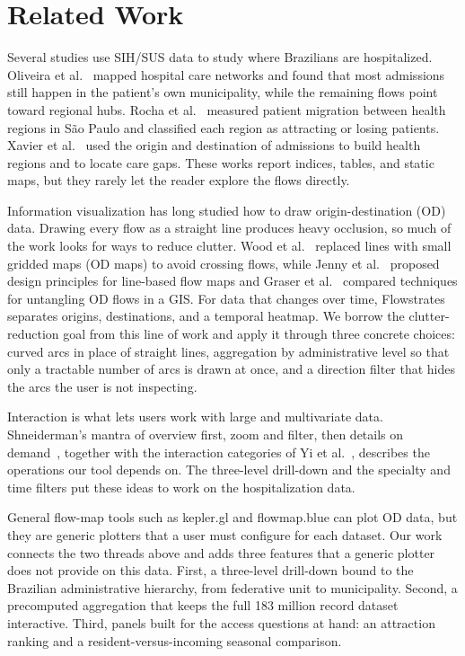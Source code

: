 \section{Related Work}

Several studies use SIH/SUS data to study where Brazilians are hospitalized.
Oliveira et al.~\cite{Oliveira2004TerritoriosSistema} mapped hospital care networks and found that most admissions still happen in the patient's own municipality, while the remaining flows point toward regional hubs.
Rocha et al.~\cite{Rocha2015HospitalizationFlow} measured patient migration between health regions in S\~{a}o Paulo and classified each region as attracting or losing patients.
Xavier et al.~\cite{Xavier2019RegioesSaude} used the origin and destination of admissions to build health regions and to locate care gaps.
These works report indices, tables, and static maps, but they rarely let the reader explore the flows directly.

Information visualization has long studied how to draw origin-destination (OD) data.
Drawing every flow as a straight line produces heavy occlusion, so much of the work looks for ways to reduce clutter.
Wood et al.~\cite{Wood2010VisualisationOrigins} replaced lines with small gridded maps (OD maps) to avoid crossing flows, while Jenny et al.~\cite{Jenny2018DesignPrinciples} proposed design principles for line-based flow maps and Graser et al.~\cite{Graser2019Untangling} compared techniques for untangling OD flows in a GIS.
For data that changes over time, Flowstrates~\cite{Boyandin2011Flowstrates} separates origins, destinations, and a temporal heatmap.
We borrow the clutter-reduction goal from this line of work and apply it through three concrete choices: curved arcs in place of straight lines, aggregation by administrative level so that only a tractable number of arcs is drawn at once, and a direction filter that hides the arcs the user is not inspecting.

Interaction is what lets users work with large and multivariate data.
Shneiderman's mantra of overview first, zoom and filter, then details on demand~\cite{Shneiderman1996EyesHaveIt}, together with the interaction categories of Yi et al.~\cite{Yi2007TowardDeeper}, describes the operations our tool depends on.
The three-level drill-down and the specialty and time filters put these ideas to work on the hospitalization data.

General flow-map tools such as kepler.gl and flowmap.blue can plot OD data, but they are generic plotters that a user must configure for each dataset.
Our work connects the two threads above and adds three features that a generic plotter does not provide on this data.
First, a three-level drill-down bound to the Brazilian administrative hierarchy, from federative unit to municipality.
Second, a precomputed aggregation that keeps the full 183 million record dataset interactive.
Third, panels built for the access questions at hand: an attraction ranking and a resident-versus-incoming seasonal comparison.
